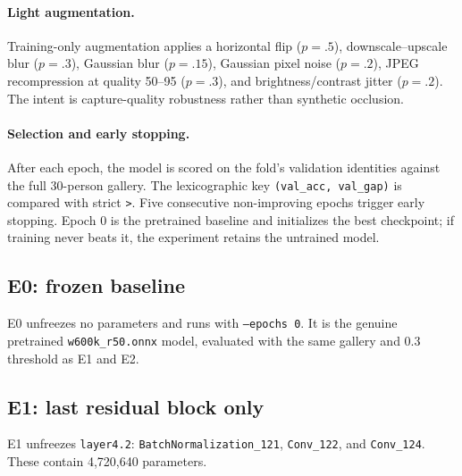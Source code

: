 \documentclass[11pt,a4paper]{article}
\newcommand{\code}[1]{\texttt{#1}}
\begin{document}
\paragraph{Light augmentation.} Training-only augmentation applies a horizontal flip ($p=.5$), downscale--upscale blur ($p=.3$), Gaussian blur ($p=.15$), Gaussian pixel noise ($p=.2$), JPEG recompression at quality 50--95 ($p=.3$), and brightness/contrast jitter ($p=.2$). The intent is capture-quality robustness rather than synthetic occlusion.

\paragraph{Selection and early stopping.} After each epoch, the model is scored on the fold's validation identities against the full 30-person gallery. The lexicographic key \code{(val\_acc, val\_gap)} is compared with strict \code{>}. Five consecutive non-improving epochs trigger early stopping. Epoch 0 is the pretrained baseline and initializes the best checkpoint; if training never beats it, the experiment retains the untrained model.

\subsection{E0: frozen baseline}

E0 unfreezes no parameters and runs with \code{--epochs 0}. It is the genuine pretrained \code{w600k\_r50.onnx} model, evaluated with the same gallery and 0.3 threshold as E1 and E2.

\subsection{E1: last residual block only}

E1 unfreezes \code{layer4.2}: \code{BatchNormalization\_121}, \code{Conv\_122}, and \code{Conv\_124}. These contain 4,720,640 parameters.
\end{document}
